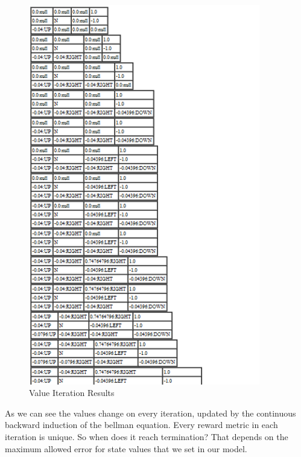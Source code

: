 \begin{figure}[h!]
    \begin{center}
        \includegraphics[width=0.90\textwidth]{Figures/Planning_Figure_2.png}
        \caption{Value Iteration Results}
        \label{fig:ValueIterationResults}
    \end{center}
\end{figure}

As we can see the values change on every iteration, updated by the continuous
backward induction of the bellman equation. Every reward metric in
each iteration is unique. So when does it reach termination? That depends on the
maximum allowed error for state values that we set in our model. 

